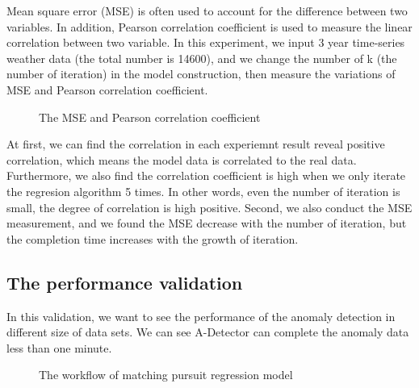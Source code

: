 \documentclass{vgtc}                          %
\begin{document}
Mean square error (MSE) is often used to account for the difference between two variables. In addition, Pearson correlation coefficient is used to measure the linear correlation between two variable. In this experiment, we input 3 year time-series weather data (the total number is 14600), and we change the number of k (the number of iteration) in the model construction, then measure the variations of MSE and Pearson correlation coefficient. 
\begin{figure}[htb]
	\caption{The MSE and Pearson correlation coefficient}
\end{figure}

	At first, we can find the correlation in each experiemnt result reveal positive correlation, which means the model data is correlated to the real data. Furthermore, we also find the correlation coefficient is high when we only iterate the regresion algorithm 5 times. In other words, even the number of iteration is small, the degree of correlation is high positive. Second, we also conduct the MSE measurement, and we found the MSE decrease with the number of iteration, but the completion time increases with the growth of iteration.
\subsection{The performance validation}
In this validation, we want to see the performance of the anomaly detection in different size of data sets. We can see A-Detector can complete the anomaly data less than one minute. 

\begin{figure}[htb]
\begin{center}
\end{center}
	\caption{The workflow of matching pursuit regression model}
\end{figure} 
\end{document}
